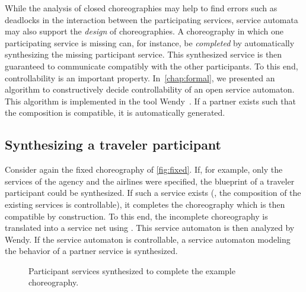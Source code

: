 While the analysis of closed choreographies may help to find errors such as deadlocks in the interaction between the participating services, service automata may also support the \emph{design} of choreographies. A choreography in which one participating service is missing can, for instance, be \emph{completed} by automatically synthesizing the missing participant service. This synthesized service is then guaranteed to communicate compatibly with the other participants. To this end, controllability is an important property. In~\autoref{chap:formal}, we presented an algorithm to constructively decide controllability of an open service automaton. This algorithm is implemented in the tool Wendy~\cite{LohmannW_2009_wendy}. If a partner exists such that the composition is compatible, it is automatically generated.




\subsection*{Synthesizing a traveler participant}

Consider again the fixed choreography of \autoref{fig:fixed}. If, for example, only the services of the agency and the airlines were specified, the blueprint of a traveler participant could be synthesized. If such a service exists (\ie, the composition of the existing services is controllable), it completes the choreography which is then compatible by construction. To this end, the incomplete choreography is translated into a service net using \bpelowfn. This service automaton is then analyzed by Wendy. If the service automaton is controllable, a service automaton modeling the behavior of a partner service is synthesized.

\begin{figure}[tb]
\centering
{}\hfill
{}
\caption{Participant services synthesized to complete the example choreography.}
\end{figure}


